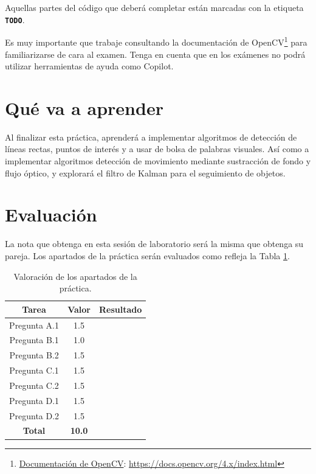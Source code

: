 Aquellas partes del código que deberá completar están marcadas con la etiqueta \textbf{\texttt{TODO}}.

Es muy importante que trabaje consultando la documentación de OpenCV\footnote{\href{https://docs.opencv.org/4.x/index.html}{Documentación de OpenCV}: \url{https://docs.opencv.org/4.x/index.html}} para familiarizarse de cara al examen. Tenga en cuenta que en los exámenes no podrá utilizar herramientas de ayuda como Copilot.

\section{Qué va a aprender}

Al finalizar esta práctica, aprenderá a implementar algoritmos de detección de líneas rectas, puntos de interés y a usar de bolsa de palabras visuales. Así como a implementar algoritmos detección de movimiento mediante sustracción de fondo y flujo óptico, y explorará el filtro de Kalman para el seguimiento de objetos.

\section{Evaluación}

La nota que obtenga en esta sesión de laboratorio será la misma que obtenga su pareja. Los apartados de la práctica serán evaluados como refleja la Tabla \ref{table:evaluacion}.

\begin{table}[h!]
    \centering
    \begin{tabular}{|c|c|c|}
    \hline
    \textbf{Tarea} & \textbf{Valor} & \textbf{Resultado} \\
    \hline
    Pregunta A.1 & 1.5 & \\
    \hline
    Pregunta B.1 & 1.0 & \\
    \hline
    Pregunta B.2 & 1.5 & \\
    \hline
    Pregunta C.1 & 1.5 & \\
    \hline
    Pregunta C.2 & 1.5 & \\
    \hline
    Pregunta D.1 & 1.5 & \\
    \hline
    Pregunta D.2 & 1.5 & \\
    \hline
    \textbf{Total} & \textbf{10.0} & \\
    \hline
    \end{tabular}
    \caption{Valoración de los apartados de la práctica.}
    \label{table:evaluacion}
\end{table}
